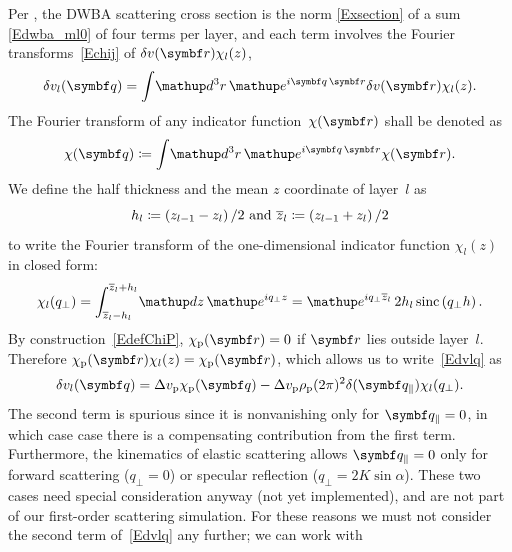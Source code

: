 Per ,
the DWBA scattering cross section is the norm \cref{Exsection}
of a sum \cref{Edwba_ml0} of four terms per layer,
and each term involves the Fourier transforms~\cref{Echij}
of $\delta v(\r)\chi_l(z)$,
\begin{equation}\label{Edvlq}
  \delta v_l(\q)
  = \int\!\d^3r\, \e^{i\v{q}\,\r}\delta v(\r) \chi_l(z).
\end{equation}
The Fourier transform of any indicator function~$\chi(\r)$ shall be denoted as
\begin{equation}
  \chi(\q) \coloneqq \int\!\d^3r\, \e^{i\v{q}\,\r} \chi(\r).
\end{equation}
We define the half thickness and the mean $z$ coordinate of layer~$l$ as
\begin{equation}
  h_l\coloneqq \left(z_{l-1}-z_l\right)/2
  \text{~and~}
  \overline{z}_l \coloneqq \left(z_{l-1}+z_l\right)/2
\end{equation}
to write the Fourier transform of the one-dimensional indicator function $\chi_l(z)$
in closed form:
\begin{equation}
  \chi_l(q_\perp)
  = \int_{\mz_l-h_l}^{\mz_l+h_l}\!\d z\, \e^{i q_\perp z}
  = \e^{i q_\perp \mz_l}\, 2h_l\, \text{sinc}\left(q_\perp h\right).
\end{equation}
By construction~\cref{EdefChiP}, $\chi_\sp(\r)=0$ if $\r$ lies outside layer~$l$.
Therefore $\chi_\sp(\r)\chi_l(z)=\chi_\sp(\r)$,
which allows us to write~\cref{Edvlq} as
\begin{equation}\label{Edvlq}
  \delta v_l(\q)
  = \Delta v_\sp\chi_\sp(\q) - \Delta v_\sp\rho_\sp (2\pi)^2\delta(\q_\parallel)\chi_l(q_\perp).
\end{equation}
The second term is spurious since it is nonvanishing only for $\q_\parallel=0$,
in which case case there is a compensating contribution from the first term.
Furthermore, the kinematics of elastic scattering allows $\q_\parallel=0$
only for forward scattering ($q_\perp=0$) or specular reflection ($q_\perp=2K\sin\alpha$).
These two cases need special consideration anyway (not yet implemented),
and are not part of our first-order scattering simulation.
For these reasons we must not consider the second term of~\cref{Edvlq} any further;
we can work with


